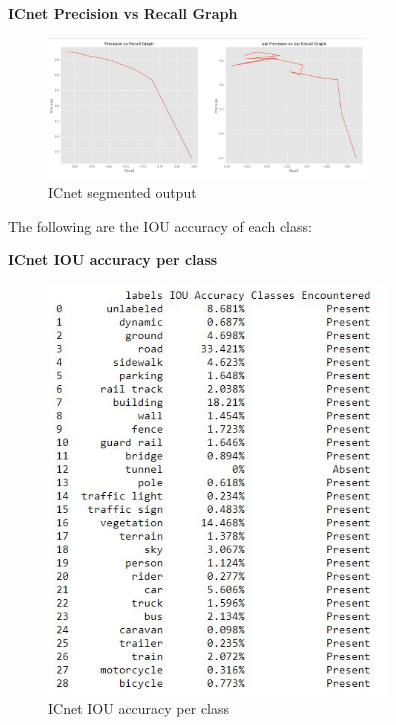 \documentclass{IEEEtran}
\begin{document}
\textbf{ICnet Precision vs Recall Graph}

\begin{figure}[h]
    \centering
    \captionsetup{justification=centering}
    \includegraphics[width=8.5cm]{ICnet-cityscrapes-B16-p-vs-re.JPG}
    \caption{ICnet segmented output}
    \label{fig:Binary class segmented output}
\end{figure}

\newpage
The following are the IOU accuracy of each class:

\textbf{ICnet IOU accuracy per class}

\begin{figure}[h]
    \centering
    \captionsetup{justification=centering}
    \includegraphics[width=9cm]{ICnet-cityscrapes-B16-IOU-C29.JPG}
    \caption{ICnet IOU accuracy per class}
    \label{fig:Binary class segmented output}
\end{figure}
\end{document}
